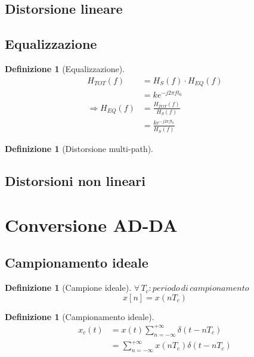 \documentclass[a4paper,10pt]{article}
\theoremstyle{mystyle}
\newtheorem{definition}[theorem]{Definizione}
\begin{document}
\subsection{Distorsione lineare}

\subsection{Equalizzazione}
\begin{definition}[Equalizzazione]
    \[
        \begin{aligned}
            H_{TOT}(f)
            &=H_S (f) \cdot H_{EQ}(f)   \\
            &=ke^{-j2\pi f t_0} \\
            \Rightarrow
            H_{EQ} (f)
            &= \frac{H_{TOT}(f)}{H_S(f)}    \\
            &= \frac{k e^{-j 2 \pi f t_0}}{H_S(f)}
        \end{aligned}
    \]
\end{definition}

\begin{definition}[Distorsione multi-path]
    
\end{definition}

\subsection{Distorsioni non lineari}


\newpage

\section{Conversione AD-DA}

\subsection{Campionamento ideale}
\begin{definition}[Campione ideale]
    \(\forall \, T_c : periodo \, di\,  campionamento\)
    \[
        x[n] = x(nT_c)
    \]
\end{definition}

\begin{definition}[Campionamento ideale]
    \[
        \begin{aligned}
            x_c(t)
            &=x(t) \sum_{n=-\infty}^{+\infty} \delta (t-nT_c) \\
            &=\sum_{n=-\infty}^{+\infty} x(nT_c) \delta (t-nT_c)
        \end{aligned}
    \]
\end{definition}
\end{document}
